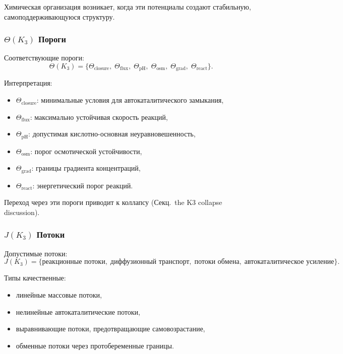 Химическая организация возникает, когда эти потенциалы создают
стабильную, самоподдерживающуюся структуру.

\subsubsection{\texorpdfstring{$\Theta(K_3)$}{\Theta(K_3)} Пороги}

Соответствующие пороги:
\[
\Theta(K_3) =
\{\Theta_{\mathrm{closure}},\;
  \Theta_{\mathrm{flux}},\;
  \Theta_{\mathrm{pH}},\;
  \Theta_{\mathrm{osm}},\;
  \Theta_{\mathrm{grad}},\;
  \Theta_{\mathrm{react}}\}.
\]

Интерпретация:
\begin{itemize}
    \item $\Theta_{\mathrm{closure}}$: минимальные условия для
          автокаталитического замыкания,
    \item $\Theta_{\mathrm{flux}}$: максимально устойчивая скорость реакций,
    \item $\Theta_{\mathrm{pH}}$: допустимая кислотно-основная
          неуравновешенность,
    \item $\Theta_{\mathrm{osm}}$: порог осмотической устойчивости,
    \item $\Theta_{\mathrm{grad}}$: границы градиента концентраций,
    \item $\Theta_{\mathrm{react}}$: энергетический порог реакций.
\end{itemize}

Переход через эти пороги приводит к коллапсу (Секц.~the K3 collapse discussion).

\subsubsection{\texorpdfstring{$J(K_3)$}{J(K_3)} Потоки}

Допустимые потоки:
\[
J(K_3) = \{\text{реакционные потоки},\; \text{диффузионный транспорт},\;
         \text{потоки обмена},\; \text{автокаталитическое усиление}\}.
\]

Типы качественные:
\begin{itemize}
    \item линейные массовые потоки,
    \item нелинейные автокаталитические потоки,
    \item выравнивающие потоки, предотвращающие самовозрастание,
    \item обменные потоки через протобеременные границы.
\end{itemize}


